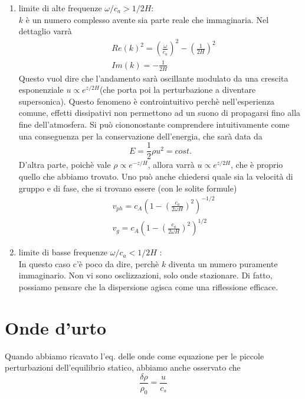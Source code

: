 \documentclass{report}
\begin{document}
\begin{enumerate}
    \item limite di alte frequenze $\omega / c_a > 1/2H$: \\ $k$ è un numero complesso avente sia parte reale che immaginaria. Nel dettaglio varrà 
    \begin{align}
        &Re(k)^2 = \left(\frac{\omega}{c_a}\right)^2 - \left(\frac{1}{2H}\right)^2 \\ &Im(k) = -\frac{1}{2H}
    \end{align}
    Questo vuol dire che l'andamento sarà oscillante modulato da una crescita esponenziale $u \propto e^{z/2H}$(che porta poi la perturbazione a diventare supersonica). Questo fenomeno è controintuitivo perchè nell'esperienza comune, effetti dissipativi non permettono ad un suono di propagarsi fino alla fine dell'atmosfera. Si può ciononostante comprendere intuitivamente come una conseguenza per la conservazione dell'energia, che sarà data da 
    \begin{equation}
        E = \frac{1}{2}\rho u^2 = cost. 
    \end{equation}
    D'altra parte, poichè vale $\rho \propto e^{-z/H}$, allora varrà $u \propto e^{z/2H}$, che è proprio quello che abbiamo trovato. Uno può anche chiedersi quale sia la velocità di gruppo e di fase, che si trovano essere (con le solite formule)
    \begin{align}
        & v_{ph} = c_A\left(1 - \left(\frac{c_a}{2\omega H}\right)^2\right)^{-1/2} \\
        & v_{g} = c_A\left(1 - \left(\frac{c_a}{2\omega H}\right)^2\right)^{1/2}
    \end{align}
    \item limite di basse frequenze $\omega / c_a < 1/2H$ : \\
    In questo caso c'è poco da dire, perchè $k$ diventa un numero puramente immaginario. Non vi sono osclizzazioni, solo onde stazionare. Di fatto, possiamo pensare che la dispersione agisca come una riflessione efficace. 
\end{enumerate}

\section{Onde d'urto}

Quando abbiamo ricavato l'eq. delle onde come equazione per le piccole perturbazioni dell'equilibrio statico, abbiamo anche osservato che 
\begin{equation}
    \frac{\delta \rho}{\rho_0} = \frac{u}{c_s}
\end{equation}
\end{document}
